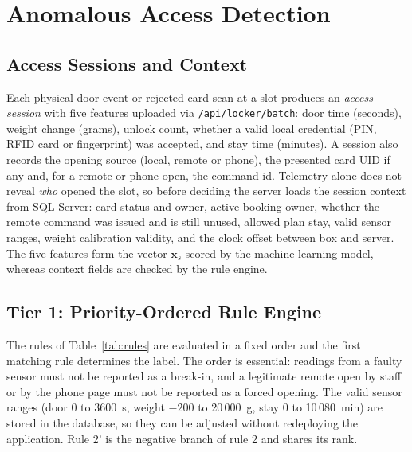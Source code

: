 \documentclass[journal,onecolumn]{IEEEtran}
\begin{document}
\section{Anomalous Access Detection}

\subsection{Access Sessions and Context}

Each physical door event or rejected card scan at a slot produces an \emph{access session} with five features uploaded
via \texttt{/api/locker/batch}: door time (seconds), weight change (grams), unlock count, whether a valid local
credential (PIN, RFID card or fingerprint) was accepted, and stay time (minutes). A session also records the opening
source (local, remote or phone), the presented card UID if any and, for a remote or phone open, the command id.
Telemetry alone does not reveal \emph{who} opened the slot, so before deciding the server loads the session context
from SQL Server: card status and owner, active booking owner, whether the remote command was issued and is still
unused, allowed plan stay, valid sensor ranges, weight calibration validity, and the clock offset between box and
server. The five features form the vector $\mathbf{x}_s$ scored by the machine-learning model, whereas context fields
are checked by the rule engine.

\subsection{Tier 1: Priority-Ordered Rule Engine}

The rules of Table~\ref{tab:rules} are evaluated in a fixed order and the first matching rule determines the label.
The order is essential: readings from a faulty sensor must not be reported as a break-in, and a legitimate remote open
by staff or by the phone page must not be reported as a forced opening. The valid sensor ranges (door 0 to 3600~s,
weight $-200$ to 20\,000~g, stay 0 to 10\,080~min) are stored in the database, so they can be adjusted without
redeploying the application. Rule 2' is the negative branch of rule 2 and shares its rank.
\end{document}
